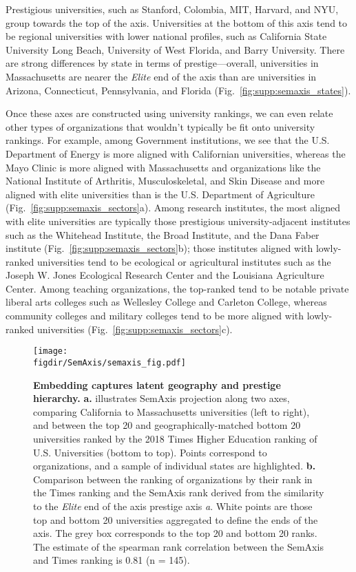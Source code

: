\documentclass[12pt]{article} %
\def\figdir{../Figs}
\begin{document}
Prestigious universities, such as Stanford, Colombia, MIT, Harvard, and NYU, group towards the top of the axis.
Universities at the bottom of this axis tend to be regional universities with lower national profiles, such as California State University Long Beach, University of West Florida, and Barry University. 
There are strong differences by state in terms of prestige---overall, universities in Massachusetts are nearer the \textit{Elite} end of the axis than are universities in Arizona, Connecticut, Pennsylvania, and Florida (Fig.~\ref{fig:supp:semaxis_states}). 

Once these axes are constructed using university rankings, we can even relate other types of organizations that wouldn't typically be fit onto university rankings.
For example, among Government institutions, we see that the U.S. Department of Energy is more aligned with Californian universities, whereas the Mayo Clinic is more aligned with Massachusetts and organizations like the National Institute of Arthritis, Musculoskeletal, and Skin Disease and more aligned with elite universities than is the U.S. Department of Agriculture (Fig.~\ref{fig:supp:semaxis_sectors}a).
Among research institutes, the most aligned with elite universities are typically those prestigious university-adjacent institutes such as the Whitehead Institute, the Broad Institute, and the Dana Faber institute (Fig.~\ref{fig:supp:semaxis_sectors}b); those institutes aligned with lowly-ranked universities tend to be ecological or agricultural institutes such as the Joseph W. Jones Ecological Research Center and the Louisiana Agriculture Center. 
Among teaching organizations, the top-ranked tend to be notable private liberal arts colleges such as Wellesley College and Carleton College, whereas community colleges and military colleges tend to be more aligned with lowly-ranked universities (Fig.~\ref{fig:supp:semaxis_sectors}c). 

%
%
\begin{figure}[hp!]
	\centering
	\texttt{[image: \\figdir/SemAxis/semaxis\_fig.pdf]}
	\caption{
		\textbf{Embedding captures latent geography and prestige hierarchy.}
		\textbf{a.} illustrates SemAxis projection along two axes, comparing California to Massachusetts universities (left to right), and between the top 20 and geographically-matched bottom 20 universities ranked by the 2018 Times Higher Education ranking of U.S. Universities (bottom to top). 
		Points correspond to organizations, and a sample of individual states are highlighted. 
		\textbf{b.} Comparison between the ranking of organizations by their rank in the Times ranking and the SemAxis rank derived from the similarity to the \textit{Elite} end of the axis prestige axis \textit{a}.
		White points are those top and bottom 20 universities aggregated to define the ends of the axis. 
		The grey box corresponds to the top 20 and bottom 20 ranks. 
	  	The estimate of the spearman rank correlation between the SemAxis and Times ranking is 0.81 (n = 145).
	}
	\label{fig:semaxis}
\end{figure}
\end{document}
